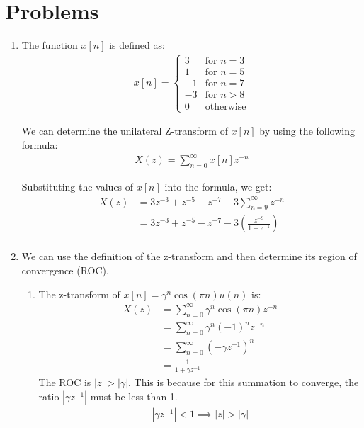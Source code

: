 \documentclass{article}
\begin{document}
\section{Problems}
\begin{enumerate}[label=P1.\arabic*]
    \item The function $x[n]$ is defined as:    
    \begin{align*}
        x[n] = \begin{cases}
            3 & \text{for } n = 3 \\
            1 & \text{for } n = 5 \\
            -1 & \text{for } n = 7 \\
            -3 & \text{for } n > 8 \\
            0 & \text{otherwise}
        \end{cases}
    \end{align*}

    We can determine the unilateral Z-transform of $x[n]$ by using the following formula:
    \begin{align*}
        X(z) = \sum_{n=0}^{\infty} x[n]z^{-n}
    \end{align*}

    Substituting the values of $x[n]$ into the formula, we get:
    \begin{align*}
        X(z) &= 3z^{-3} + z^{-5} - z^{-7} - 3\sum_{n=9}^{\infty} z^{-n} \\
        &= 3z^{-3} + z^{-5} - z^{-7} - 3\left(\frac{z^{-9}}{1 - z^{-1}}\right) \\
    \end{align*}

    \item We can use the definition of the z-transform and then determine its region of convergence (ROC).
    \begin{enumerate}
        \item The z-transform of $x[n] = \gamma^n \cos(\pi n)u(n)$ is:
        \begin{align*}
            X(z) &= \sum_{n=0}^{\infty} \gamma^n \cos(\pi n)z^{-n} \\
            &= \sum_{n=0}^{\infty} \gamma^n(-1)^n z^{-n} \\
            &= \sum_{n=0}^{\infty} (-\gamma z^{-1})^n \\
            &= \frac{1}{1 + \gamma z^{-1}}
        \end{align*}
        The ROC is $|z| > |\gamma|$. This is because for this summation to converge, the ratio $|\gamma z^{-1}|$ must be less than 1.
        \begin{align*}
            |\gamma z^{-1}| < 1 \implies |z| > |\gamma|
        \end{align*}


\end{enumerate}
\end{enumerate}
\end{document}
